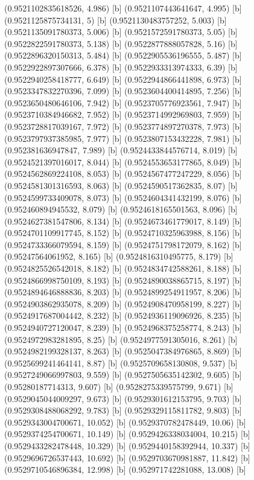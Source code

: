 {{{(0.9521102835618526, 4.986) [b] 
(0.9521107443641647, 4.995) [b] 
(0.9521125875734131, 5) [b] 
(0.9521130483757252, 5.003) [b] 
(0.9521135091780373, 5.006) [b] 
(0.9521572591780373, 5.05) [b] 
(0.9522822591780373, 5.138) [b] 
(0.9522877888057828, 5.16) [b] 
(0.9522896320150313, 5.484) [b] 
(0.9522905536196555, 5.487) [b] 
(0.9522922897307666, 6.378) [b] 
(0.9522933313974333, 6.39) [b] 
(0.9522940258418777, 6.649) [b] 
(0.9522944866441898, 6.973) [b] 
(0.9523347832270396, 7.099) [b] 
(0.9523604400414895, 7.256) [b] 
(0.9523650480646106, 7.942) [b] 
(0.9523705776923561, 7.947) [b] 
(0.9523710384946682, 7.952) [b] 
(0.9523714992969803, 7.959) [b] 
(0.9523728817039167, 7.972) [b] 
(0.9523774897270378, 7.973) [b] 
(0.9523797937385985, 7.977) [b] 
(0.9523807153432228, 7.981) [b] 
(0.952381636947847, 7.989) [b] 
(0.9524433844576714, 8.019) [b] 
(0.9524521397016017, 8.044) [b] 
(0.9524553653177865, 8.049) [b] 
(0.9524562869224108, 8.053) [b] 
(0.9524567477247229, 8.056) [b] 
(0.9524581301316593, 8.063) [b] 
(0.9524590517362835, 8.07) [b] 
(0.9524599733409078, 8.073) [b] 
(0.9524604341432199, 8.076) [b] 
(0.952460894945532, 8.079) [b] 
(0.9524618165501563, 8.096) [b] 
(0.9524627381547806, 8.134) [b] 
(0.9524673461779017, 8.149) [b] 
(0.9524701109917745, 8.152) [b] 
(0.9524710325963988, 8.156) [b] 
(0.9524733366079594, 8.159) [b] 
(0.9524751798172079, 8.162) [b] 
(0.95247564061952, 8.165) [b] 
(0.9524816310495775, 8.179) [b] 
(0.9524825526542018, 8.182) [b] 
(0.9524834742588261, 8.188) [b] 
(0.9524866998750109, 8.193) [b] 
(0.9524890038865715, 8.197) [b] 
(0.9524894646888836, 8.203) [b] 
(0.9524899254911957, 8.206) [b] 
(0.9524903862935078, 8.209) [b] 
(0.9524908470958199, 8.227) [b] 
(0.9524917687004442, 8.232) [b] 
(0.9524936119096926, 8.235) [b] 
(0.9524940727120047, 8.239) [b] 
(0.9524968375258774, 8.243) [b] 
(0.9524972983281895, 8.25) [b] 
(0.9524977591305016, 8.261) [b] 
(0.9524982199328137, 8.263) [b] 
(0.9525047384976865, 8.869) [b] 
(0.9525699241464141, 8.87) [b] 
(0.9525709658130808, 9.537) [b] 
(0.9527249066997803, 9.559) [b] 
(0.9527505635142302, 9.605) [b] 
(0.95280187714313, 9.607) [b] 
(0.9528275339575799, 9.671) [b] 
(0.9529045044009297, 9.673) [b] 
(0.9529301612153795, 9.703) [b] 
(0.9529308488068292, 9.783) [b] 
(0.9529329115811782, 9.803) [b] 
(0.9529343004700671, 10.052) [b] 
(0.9529370782478449, 10.06) [b] 
(0.9529374254700671, 10.149) [b] 
(0.9529426338034004, 10.215) [b] 
(0.9529433282478448, 10.329) [b] 
(0.9529440158392944, 10.337) [b] 
(0.9529696726537443, 10.692) [b] 
(0.9529703670981887, 11.842) [b] 
(0.9529710546896384, 12.998) [b] 
(0.952971742281088, 13.008) [b] 
}}}

